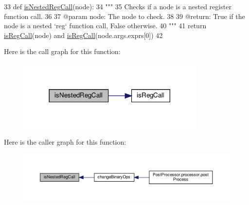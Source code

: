 \begin{DoxyCode}
33 \textcolor{keyword}{def }\hyperlink{namespacePostProcessor_1_1utils_a86292ec94138d20acb13a3c9c136a468}{isNestedRegCall}(node):
34     \textcolor{stringliteral}{"""
}
35 \textcolor{stringliteral}{    Checks if a node is a nested register function call.
}
36 \textcolor{stringliteral}{
}
37 \textcolor{stringliteral}{    @param node: The node to check.
}
38 \textcolor{stringliteral}{
}
39 \textcolor{stringliteral}{    @return: True if the node is a nested `reg` function call, False otherwise.
}
40 \textcolor{stringliteral}{    """}
41     \textcolor{keywordflow}{return} \hyperlink{namespacePostProcessor_1_1utils_a89d6f2461251261de6b862c69fe3c44a}{isRegCall}(node) \textcolor{keywordflow}{and} \hyperlink{namespacePostProcessor_1_1utils_a89d6f2461251261de6b862c69fe3c44a}{isRegCall}(node.args.exprs[0])
42 
\end{DoxyCode}
Here is the call graph for this function\+:\nopagebreak
\begin{figure}[H]
\begin{center}
\leavevmode
\includegraphics[width=266pt]{namespacePostProcessor_1_1utils_a86292ec94138d20acb13a3c9c136a468_cgraph}
\end{center}
\end{figure}
Here is the caller graph for this function\+:\nopagebreak
\begin{figure}[H]
\begin{center}
\leavevmode
\includegraphics[width=350pt]{namespacePostProcessor_1_1utils_a86292ec94138d20acb13a3c9c136a468_icgraph}
\end{center}
\end{figure}
\mbox{\label{namespacePostProcessor_1_1utils_a89d6f2461251261de6b862c69fe3c44a}} 
